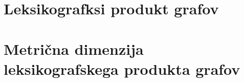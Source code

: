\documentclass[mat1, tisk]{fmfdelo}
\begin{document}





\section{Leksikografksi produkt grafov}
\section{Metrična dimenzija leksikografskega produkta grafov}

\end{document}
